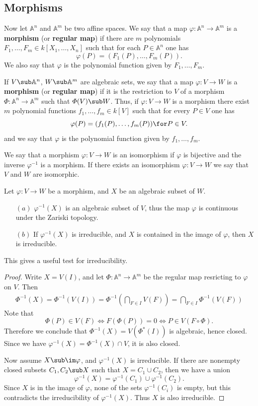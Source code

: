 \subsection{Morphisms}
Now let $\mathbb{A}^n$ and $\mathbb{A}^m$ be two affine spaces. We say that a map $\varphi:\mathbb{A}^n\to\mathbb{A}^m$ is a \textbf{morphism} (or \textbf{regular map}) if there are $m$ polynomials $F_1,\dots,F_m\in k[X_1,\dots,X_n]$ such that for each $P\in\mathbb{A}^n$ one has
\[\varphi(P)=(F_1(P),\dots,F_m(P)).\]
We also say that $\varphi$ is the polynomial function given by $F_1,\dots,F_m$.\par
If $V\sub\mathbb{A}^n$, $W\sub\mathbb{A}^m$ are algebraic sets, we say that a map $\varphi:V\to W$ is a \textbf{morphism} (or \textbf{regular map}) if it is the restriction to $V$ of a morphism $\varPhi:\mathbb{A}^n\to\mathbb{A}^m$ such that $\varPhi(V)\sub W$. Thus, if $\varphi:V\to W$ is a morphism there exist $m$ polynomial functions $f_1,\dots,f_m\in k[V]$ such that for every $P\in V$ one has \[\varphi(P)=(f_1(P),\dots,f_m(P))\for P\in V.\]
and we say that $\varphi$ is the polynomial function given by $f_1,\dots,f_m$.\par
We say that a morphism $\varphi:V\to W$ is an isomorphism if $\varphi$ is bijective and the inverse $\varphi^{-1}$ is a morphism. If there exists an isomorphism $\varphi:V\to W$ we say that $V$ and $W$ are isomorphic.\par
\begin{proposition}\label{morphism is continuous}
Let $\varphi:V\to W$ be a morphism, and $X$ be an algebraic subset of $W$.
\begin{itemize}
\item[$(a)$] $\varphi^{-1}(X)$ is an algebraic subset of $V$, thus the map $\varphi$ is continuous under the Zariski topology.
\item[$(b)$] If $\varphi^{-1}(X)$ is irreducible, and $X$ is contained in the image of $\varphi$, then $X$ is irreducible.
\end{itemize}
This gives a useful test for irreducibility.
\end{proposition}
\begin{proof}
Write $X=V(I)$, and let $\varPhi:\mathbb{A}^n\to\mathbb{A}^m$ be the regular map resricting to $\varphi$ on $V$. Then
\begin{align*}
\varPhi^{-1}(X)=\varPhi^{-1}(V(I))=\varPhi^{-1}(\bigcap_{F\in I}V(F))=\bigcap_{F\in I}\varPhi^{-1}(V(F))
\end{align*}
Note that
\[\varPhi(P)\in V(F)\iff F(\varPhi(P))=0\iff P\in V(F\circ\varPhi).\]
Therefore we conclude that $\varPhi^{-1}(X)=V(\varPhi^*(I))$ is algebraic, hence closed. Since we have $\varphi^{-1}(X)=\varPhi^{-1}(X)\cap V$, it is also closed.\par 
Now assume $X\sub\im\varphi$, and $\varphi^{-1}(X)$ is irreducible. If there are nonempty closed subsets $C_1,C_2\sub X$ such that $X=C_1\cup C_2$, then we have a union \[\varphi^{-1}(X)=\varphi^{-1}(C_1)\cup\varphi^{-1}(C_2).\] 
Since $X$ is in the image of $\varphi$, none of the sets $\varphi^{-1}(C_i)$ is empty, but this contradicts the irreducibility of $\varphi^{-1}(X)$. Thus $X$ is also irreducible.
\end{proof}
